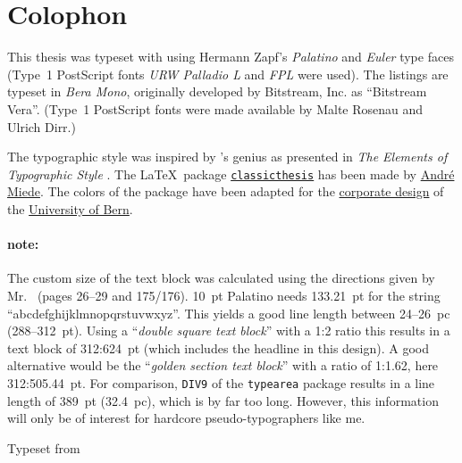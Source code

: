 \pagestyle{empty}
\hfill
\vfill
\section*{Colophon}
This thesis was typeset with \href{http://www.latex-project.org/}{\LaTeXe} using Hermann Zapf's \emph{Palatino} and \emph{Euler} type faces (Type~1 PostScript fonts \emph{URW Palladio L} and \emph{FPL} were used). The listings are typeset in \emph{Bera Mono}, originally developed by Bitstream, Inc. as ``Bitstream Vera''. (Type~1 PostScript fonts were made available by Malte Rosenau and Ulrich Dirr.)

The typographic style was inspired by 's genius as presented in \emph{The Elements of Typographic Style} \citep{bringhurst:2002}. The \LaTeX\ package \href{http://www.ctan.org/tex-archive/macros/latex/contrib/classicthesis/}{\texttt{classicthesis}} has been made by \href{http://www.miede.de}{André Miede}. The colors of the package have been adapted for the \href{http://www.kommunikation.unibe.ch/intern/content/beratung/corporate_design/logo_schriften__farben/}{corporate design} of the \href{http://www.unibe.ch/}{University of Bern}.

\paragraph{note:} The custom size of the text block was calculated using the directions given by Mr.\ \citeauthor{bringhurst:2002} (pages 26--29 and 175/176). \SI{10}{pt} Palatino needs \SI{133.21}{pt} for the string ``abcdefghijklmnopqrstuvwxyz''. This yields a good line length between 24--\SI{26}{pc} (288--\SI{312}{pt}). Using a ``\emph{double square text block}'' with a 1:2 ratio this results in a text block of 312:\SI{624}{pt} (which includes the headline in this design). A good alternative would be the ``\emph{golden section text block}'' with a ratio of 1:1.62, here 312:\SI{505.44}{pt}. For comparison, \texttt{DIV9} of the \texttt{typearea} package results in a line length of \SI{389}{pt} (\SI{32.4}{pc}), which is by far too long. However, this information will only be of interest for hardcore pseudo-typographers like me.

%

\bigskip
\noindent Typeset from \myVersion
